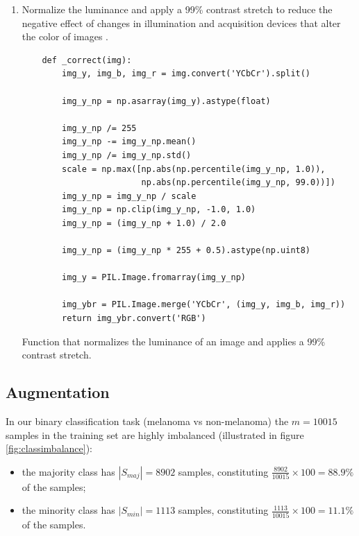 \begin{enumerate}
    \item Normalize the luminance and apply a 99\% contrast stretch to reduce the negative effect of changes in illumination and acquisition devices that alter the color of images \cite{colorconstancy}.

    \begin{listing}[ht]
    \begin{verbatim}
    def _correct(img):
        img_y, img_b, img_r = img.convert('YCbCr').split()

        img_y_np = np.asarray(img_y).astype(float)

        img_y_np /= 255
        img_y_np -= img_y_np.mean()
        img_y_np /= img_y_np.std()
        scale = np.max([np.abs(np.percentile(img_y_np, 1.0)),
                        np.abs(np.percentile(img_y_np, 99.0))])
        img_y_np = img_y_np / scale
        img_y_np = np.clip(img_y_np, -1.0, 1.0)
        img_y_np = (img_y_np + 1.0) / 2.0

        img_y_np = (img_y_np * 255 + 0.5).astype(np.uint8)

        img_y = PIL.Image.fromarray(img_y_np)

        img_ybr = PIL.Image.merge('YCbCr', (img_y, img_b, img_r))
        return img_ybr.convert('RGB')
    \end{verbatim}
    \caption{Function that normalizes the luminance of an image and applies a 99\% contrast stretch.}
    \label{code:correct}
    \end{listing}
\end{enumerate}

\subsection{Augmentation}
\label{subsection:augmentation}

In our binary classification task (melanoma vs non-melanoma) the $m = 10015$ samples in the training set are highly imbalanced (illustrated in figure \ref{fig:classimbalance}):

\begin{itemize}
    \item the majority class has $|S_{maj}| = 8902$ samples, constituting $\frac{8902}{10015} \times 100 = 88.9\%$ of the samples;
    \item the minority class has $|S_{min}| = 1113$ samples, constituting $\frac{1113}{10015} \times 100 = 11.1\%$ of the samples.
\end{itemize}

